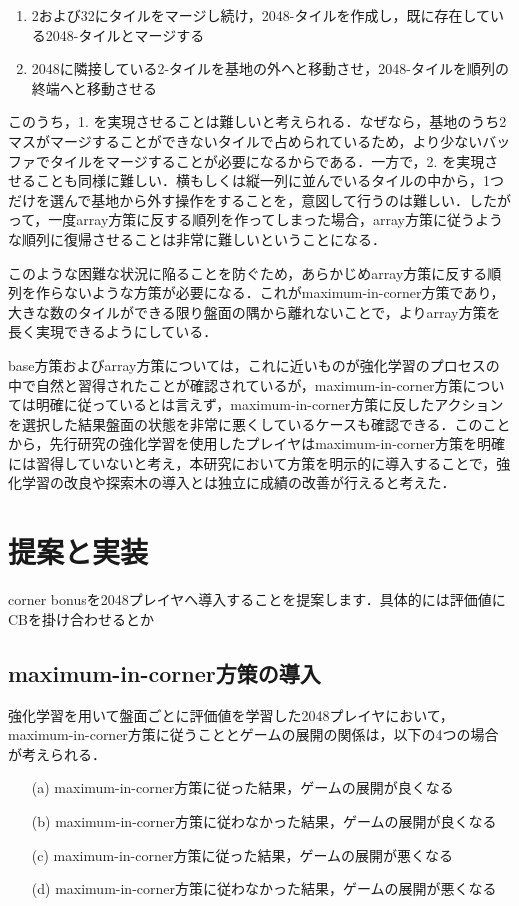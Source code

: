 \documentclass{suribt}
\begin{document}
\begin{enumerate}
\item 2および32にタイルをマージし続け，2048-タイルを作成し，既に存在している2048-タイルとマージする
\item 2048に隣接している2-タイルを基地の外へと移動させ，2048-タイルを順列の終端へと移動させる
\end{enumerate}

このうち，1. を実現させることは難しいと考えられる．なぜなら，基地のうち2マスがマージすることができないタイルで占められているため，より少ないバッファでタイルをマージすることが必要になるからである．一方で，2. を実現させることも同様に難しい．横もしくは縦一列に並んでいるタイルの中から，1つだけを選んで基地から外す操作をすることを，意図して行うのは難しい．したがって，一度array方策に反する順列を作ってしまった場合，array方策に従うような順列に復帰させることは非常に難しいということになる．

このような困難な状況に陥ることを防ぐため，あらかじめarray方策に反する順列を作らないような方策が必要になる．これがmaximum-in-corner方策であり，大きな数のタイルができる限り盤面の隅から離れないことで，よりarray方策を長く実現できるようにしている．

base方策およびarray方策については，これに近いものが強化学習のプロセスの中で自然と習得されたことが確認されているが，maximum-in-corner方策については明確に従っているとは言えず，maximum-in-corner方策に反したアクションを選択した結果盤面の状態を非常に悪くしているケースも確認できる．このことから，先行研究の強化学習を使用したプレイヤはmaximum-in-corner方策を明確には習得していないと考え，本研究において方策を明示的に導入することで，強化学習の改良や探索木の導入とは独立に成績の改善が行えると考えた．

\chapter{提案と実装}
corner bonusを2048プレイヤへ導入することを提案します．具体的には評価値にCBを掛け合わせるとか
\section{maximum-in-corner方策の導入}
強化学習を用いて盤面ごとに評価値を学習した2048プレイヤにおいて，maximum-in-corner方策に従うこととゲームの展開の関係は，以下の4つの場合が考えられる．

\begin{enumerate}
\item[(a)] maximum-in-corner方策に従った結果，ゲームの展開が良くなる
\item[(b)] maximum-in-corner方策に従わなかった結果，ゲームの展開が良くなる
\item[(c)] maximum-in-corner方策に従った結果，ゲームの展開が悪くなる
\item[(d)] maximum-in-corner方策に従わなかった結果，ゲームの展開が悪くなる
\end{enumerate}
\end{document}
